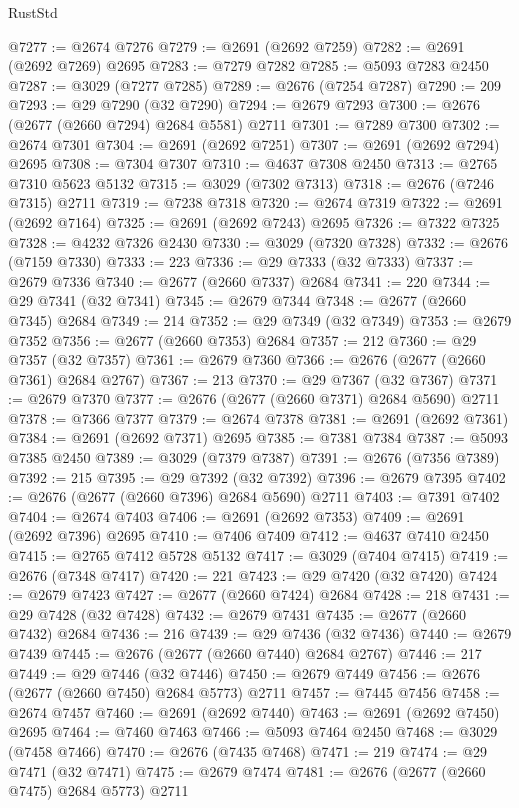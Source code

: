 \begin{lexlean}{RustStd}
\begin{coremodule}
@7277 := @2674 @7276
@7279 := @2691 (@2692 @7259)
@7282 := @2691 (@2692 @7269) @2695
@7283 := @7279 @7282
@7285 := @5093 @7283 @2450
@7287 := @3029 (@7277 @7285)
@7289 := @2676 (@7254 @7287)
@7290 := 209
@7293 := @29 @7290 (@32 @7290)
@7294 := @2679 @7293
@7300 := @2676 (@2677 (@2660 @7294) @2684 @5581) @2711
@7301 := @7289 @7300
@7302 := @2674 @7301
@7304 := @2691 (@2692 @7251)
@7307 := @2691 (@2692 @7294) @2695
@7308 := @7304 @7307
@7310 := @4637 @7308 @2450
@7313 := @2765 @7310 @5623 @5132
@7315 := @3029 (@7302 @7313)
@7318 := @2676 (@7246 @7315) @2711
@7319 := @7238 @7318
@7320 := @2674 @7319
@7322 := @2691 (@2692 @7164)
@7325 := @2691 (@2692 @7243) @2695
@7326 := @7322 @7325
@7328 := @4232 @7326 @2430
@7330 := @3029 (@7320 @7328)
@7332 := @2676 (@7159 @7330)
@7333 := 223
@7336 := @29 @7333 (@32 @7333)
@7337 := @2679 @7336
@7340 := @2677 (@2660 @7337) @2684
@7341 := 220
@7344 := @29 @7341 (@32 @7341)
@7345 := @2679 @7344
@7348 := @2677 (@2660 @7345) @2684
@7349 := 214
@7352 := @29 @7349 (@32 @7349)
@7353 := @2679 @7352
@7356 := @2677 (@2660 @7353) @2684
@7357 := 212
@7360 := @29 @7357 (@32 @7357)
@7361 := @2679 @7360
@7366 := @2676 (@2677 (@2660 @7361) @2684 @2767)
@7367 := 213
@7370 := @29 @7367 (@32 @7367)
@7371 := @2679 @7370
@7377 := @2676 (@2677 (@2660 @7371) @2684 @5690) @2711
@7378 := @7366 @7377
@7379 := @2674 @7378
@7381 := @2691 (@2692 @7361)
@7384 := @2691 (@2692 @7371) @2695
@7385 := @7381 @7384
@7387 := @5093 @7385 @2450
@7389 := @3029 (@7379 @7387)
@7391 := @2676 (@7356 @7389)
@7392 := 215
@7395 := @29 @7392 (@32 @7392)
@7396 := @2679 @7395
@7402 := @2676 (@2677 (@2660 @7396) @2684 @5690) @2711
@7403 := @7391 @7402
@7404 := @2674 @7403
@7406 := @2691 (@2692 @7353)
@7409 := @2691 (@2692 @7396) @2695
@7410 := @7406 @7409
@7412 := @4637 @7410 @2450
@7415 := @2765 @7412 @5728 @5132
@7417 := @3029 (@7404 @7415)
@7419 := @2676 (@7348 @7417)
@7420 := 221
@7423 := @29 @7420 (@32 @7420)
@7424 := @2679 @7423
@7427 := @2677 (@2660 @7424) @2684
@7428 := 218
@7431 := @29 @7428 (@32 @7428)
@7432 := @2679 @7431
@7435 := @2677 (@2660 @7432) @2684
@7436 := 216
@7439 := @29 @7436 (@32 @7436)
@7440 := @2679 @7439
@7445 := @2676 (@2677 (@2660 @7440) @2684 @2767)
@7446 := 217
@7449 := @29 @7446 (@32 @7446)
@7450 := @2679 @7449
@7456 := @2676 (@2677 (@2660 @7450) @2684 @5773) @2711
@7457 := @7445 @7456
@7458 := @2674 @7457
@7460 := @2691 (@2692 @7440)
@7463 := @2691 (@2692 @7450) @2695
@7464 := @7460 @7463
@7466 := @5093 @7464 @2450
@7468 := @3029 (@7458 @7466)
@7470 := @2676 (@7435 @7468)
@7471 := 219
@7474 := @29 @7471 (@32 @7471)
@7475 := @2679 @7474
@7481 := @2676 (@2677 (@2660 @7475) @2684 @5773) @2711

\end{coremodule}
\end{lexlean}

